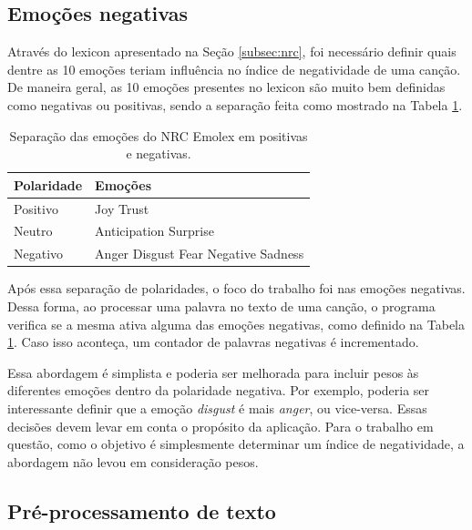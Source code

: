 \subsection{Emoções negativas}

Através do lexicon apresentado na Seção \ref{subsec:nrc}, foi necessário
definir quais dentre as 10 emoções teriam influência no índice de 
negatividade de uma canção. De maneira geral, as 10 emoções presentes 
no lexicon são muito bem definidas como negativas ou positivas, sendo
a separação feita como mostrado na Tabela \ref{tab:emolexposneg}.

\begin{table}[h]
	\centering
	\begin{tabular}{|l|p{20mm}|}
		\hline
		\textbf{Polaridade} & \textbf{Emoções} \\ \hline
		Positivo & Joy \newline Trust \\ \hline
		Neutro & Anticipation \newline Surprise \\ \hline
		Negativo & Anger \newline Disgust \newline Fear 
		\newline Negative \newline Sadness \\ \hline
	\end{tabular}
	\caption{\label{tab:emolexposneg} Separação das emoções do NRC Emolex em
	positivas e negativas.}
\end{table}

Após essa separação de polaridades, o foco do trabalho foi nas emoções
negativas. Dessa forma, ao processar uma palavra no texto de uma canção,
o programa verifica se a mesma ativa alguma das emoções negativas,
como definido na Tabela \ref{tab:emolexposneg}. Caso isso aconteça,
um contador de palavras negativas é incrementado.

Essa abordagem é simplista e poderia ser melhorada para incluir pesos
às diferentes emoções dentro da polaridade negativa. Por exemplo, poderia
ser interessante definir que a emoção \textit{disgust} é mais
\textit{anger}, ou vice-versa. Essas decisões devem levar em conta o propósito da aplicação. Para o trabalho em questão, como o objetivo é
simplesmente determinar um índice de negatividade, a abordagem não
levou em consideração pesos.

\subsection{Pré-processamento de texto} \label{subsec:pre}

